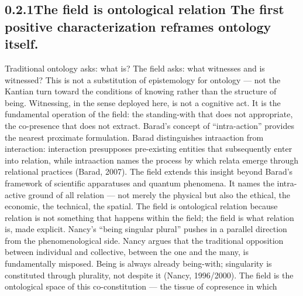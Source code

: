 \subsection{0.2.1\quad The field is ontological relation The first positive characterization reframes ontology itself.}

Traditional ontology asks: what is? The field asks: what witnesses and is witnessed? This is not a substitution of epistemology for ontology — not the Kantian turn toward the conditions of knowing rather than the structure of being. Witnessing, in the sense deployed here, is not a cognitive act. It is the fundamental operation of the field: the standing-with that does not appropriate, the co-presence that does not extract. Barad’s concept of “intra-action” provides the nearest proximate formulation. Barad distinguishes intraaction from interaction: interaction presupposes pre-existing entities that subsequently enter into relation, while intraaction names the process by which relata emerge through relational practices (Barad, 2007). The field extends this insight beyond Barad’s framework of scientific apparatuses and quantum phenomena. It names the intra-active ground of all relation — not merely the physical but also the ethical, the economic, the technical, the spatial. The field is ontological relation because relation is not something that happens within the field; the field is what relation is, made explicit. Nancy’s “being singular plural” pushes in a parallel direction from the phenomenological side. Nancy argues that the traditional opposition between individual and collective, between the one and the many, is fundamentally misposed. Being is always already being-with; singularity is constituted through plurality, not despite it (Nancy, 1996/2000). The field is the ontological space of this co-constitution — the tissue of copresence in which

